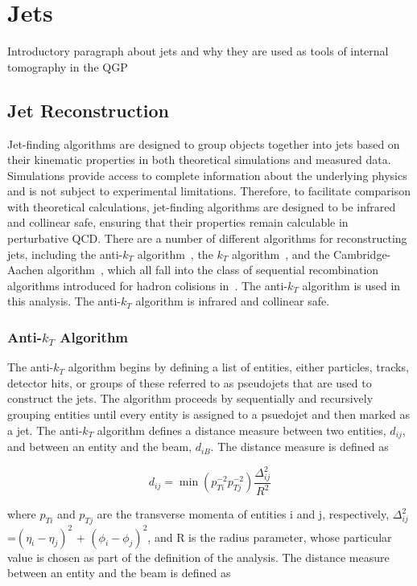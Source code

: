\section{Jets}

Introductory paragraph about jets and why they are used as tools of internal tomography in the QGP

\subsection*{Jet Reconstruction}

Jet-finding algorithms are designed to group objects together into jets based on their kinematic properties in both theoretical simulations and measured data. Simulations provide access to complete information about the underlying physics and is not subject to experimental limitations. Therefore, to facilitate comparison with theoretical calculations, jet-finding algorithms are designed to be infrared and collinear safe, ensuring that their properties remain calculable in perturbative QCD. There are a number of different algorithms for reconstructing jets, including the anti-$k_T$ algorithm~\cite{antiKt}, the $k_T$ algorithm~\cite{kT}, and the Cambridge-Aachen algorithm~\cite{FastJet}, which all fall into the class of sequential recombination algorithms introduced for hadron colisions in~\cite{seq_rec}. The anti-$k_T$ algorithm is used in this analysis. The anti-$k_T$ algorithm is infrared and collinear safe.

\subsubsection*{Anti-$k_T$ Algorithm}
The anti-$k_T$ algorithm begins by defining a list of entities, either particles, tracks, detector hits, or groups of these referred to as pseudojets that are used to construct the jets. The algorithm proceeds by sequentially and recursively grouping entities until every entity is assigned to a psuedojet and then marked as a jet.  The anti-$k_T$ algorithm defines a distance measure between two entities, $d_{ij}$, and between an entity and the beam, $d_{iB}$. The distance measure is defined as

\begin{equation}
d_{ij} = \min(p_{Ti}^{-2} p_{Tj}^{-2})\frac{\Delta_{ij}^2}{R^2}
\end{equation}

where $p_{Ti}$ and $p_{Tj}$ are the transverse momenta of entities i and j, respectively, $\Delta_{ij}^2$=$(\eta_i - \eta_j )^2$ + $(\phi_i - \phi_j )^2$, and R is the radius parameter, whose particular value is chosen as part of the definition of the analysis. The distance measure between an entity and the beam is defined as


